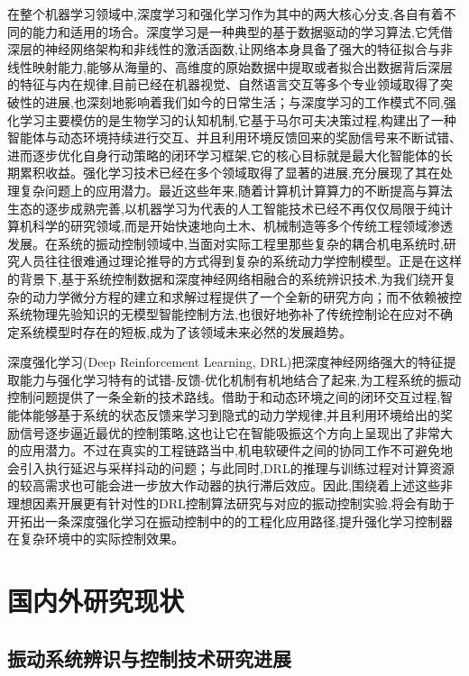 \documentclass{scrbook}
\begin{document}
{在整个机器学习领域中,深度学习和强化学习作为其中的两大核心分支,各自有着不同的能力和适用的场合。深度学习是一种典型的基于数据驱动的学习算法,它凭借深层的神经网络架构和非线性的激活函数,让网络本身具备了强大的特征拟合与非线性映射能力,能够从海量的、高维度的原始数据中提取或者拟合出数据背后深层的特征与内在规律,目前已经在机器视觉、自然语言交互等多个专业领域取得了突破性的进展,也深刻地影响着我们如今的日常生活；与深度学习的工作模式不同,强化学习主要模仿的是生物学习的认知机制,它基于马尔可夫决策过程,构建出了一种智能体与动态环境持续进行交互、并且利用环境反馈回来的奖励信号来不断试错、进而逐步优化自身行动策略的闭环学习框架,它的核心目标就是最大化智能体的长期累积收益。强化学习技术已经在多个领域取得了显著的进展,充分展现了其在处理复杂问题上的应用潜力。最近这些年来,随着计算机计算算力的不断提高与算法生态的逐步成熟完善,以机器学习为代表的人工智能技术已经不再仅仅局限于纯计算机科学的研究领域,而是开始快速地向土木、机械制造等多个传统工程领域渗透发展。在系统的振动控制领域中,当面对实际工程里那些复杂的耦合机电系统时,研究人员往往很难通过理论推导的方式得到复杂的系统动力学控制模型。正是在这样的背景下,基于系统控制数据和深度神经网络相融合的系统辨识技术,为我们绕开复杂的动力学微分方程的建立和求解过程提供了一个全新的研究方向；而不依赖被控系统物理先验知识的无模型智能控制方法,也很好地弥补了传统控制论在应对不确定系统模型时存在的短板,成为了该领域未来必然的发展趋势\cite{bib3}。

深度强化学习(Deep Reinforcement Learning, DRL)把深度神经网络强大的特征提取能力与强化学习特有的试错-反馈-优化机制有机地结合了起来,为工程系统的振动控制问题提供了一条全新的技术路线。借助于和动态环境之间的闭环交互过程,智能体能够基于系统的状态反馈来学习到隐式的动力学规律,并且利用环境给出的奖励信号逐步逼近最优的控制策略,这也让它在智能吸振这个方向上呈现出了非常大的应用潜力。不过在真实的工程链路当中,机电软硬件之间的协同工作不可避免地会引入执行延迟与采样抖动的问题；与此同时,DRL的推理与训练过程对计算资源的较高需求也可能会进一步放大作动器的执行滞后效应。因此,围绕着上述这些非理想因素开展更有针对性的DRL控制算法研究与对应的振动控制实验,将会有助于开拓出一条深度强化学习在振动控制中的的工程化应用路径,提升强化学习控制器在复杂环境中的实际控制效果。

\section{\label{ref-006}国内外研究现状\label{mark-1.2}}

\subsection{\label{ref-007}振动系统辨识与控制技术研究进展\label{mark-1.2.1}}

}
\end{document}
